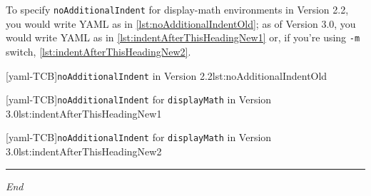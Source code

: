  To specify \texttt{noAdditionalIndent} for display-math environments in Version 2.2, you
  would write YAML as in \cref{lst:noAdditionalIndentOld}; as of Version 3.0, you would
  write YAML as in \cref{lst:indentAfterThisHeadingNew1} or, if you're using \texttt{-m}
  switch, \cref{lst:indentAfterThisHeadingNew2}. 

  \begin{minipage}{.45\textwidth}
   [yaml-TCB]{\texttt{noAdditionalIndent} in Version 2.2}{lst:noAdditionalIndentOld}
  \end{minipage}%
  \hfill
  \begin{minipage}{.45\textwidth}
   [yaml-TCB]{\texttt{noAdditionalIndent} for \texttt{displayMath} in Version 3.0}{lst:indentAfterThisHeadingNew1}

   [yaml-TCB]{\texttt{noAdditionalIndent} for \texttt{displayMath} in Version 3.0}{lst:indentAfterThisHeadingNew2}
  \end{minipage}%

  \mbox{}\hfill
  \begin{minipage}{.25\textwidth}
   \hrule

   \hfill\itshape End\\\mbox{}\hfill\mbox{}

  \end{minipage}
